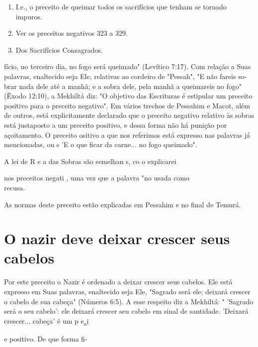 \begin{itemize}
\begin{enumrate}
\begin{itemize}
\begin{itemize}
\begin{enumerate}
\def\labelenumi{\arabic{enumi}.}
\setcounter{enumi}{118}
\item
 
 I.e., o preceito de queimar todos os sacrifícios que tenham se tornado
 impuros.
 
\item
 
 Ver os preceitos negativos 323 a 329.
 
\item
 
 Dos Sacrifícios Consagrados.
 
\end{enumerate}




fício, no terceiro dia, no fogo será queimado" (Levítico 7:17). Com
relação a Suas palavras, enaltecido seja Ele, relativas ao cordeiro de
"Pessah", "E não fareis so­brar nada dele até a manhã; e a sobra dele,
pela manhã a queimareis no fogo" (Êxodo 12:10), a Mekhiltá diz: "O
objetivo das Escrituras é estipular um preceito positivo para o preceito
negativo". Em vários trechos de Pessahim e Macot, além de outros, está
explicitamente declarado que o preceito negativo relativo às so­bras
está justaposto a um preceito positivo, e dessa forma não há punição por
açoitamento. O preceito ositivo a que nos referimos está expresso nas
palavras já mencionadas, ou s 'E o que ficar da carne... no fogo
queimado".

A lei de R e a das Sobras são semelhan s, co o explicarei

nos preceitos negati , uma vez que a palavra "no usada como\\
recusa.

As normas deste preceito estão explicadas em Pessahim e no final de
Temurá.

\section{O nazir deve deixar crescer seus cabelos}

Por este preceito o Nazir é ordenado a deixar crescer seus cabelos. Ele
está expresso em Suas palavras, enaltecido seja Ele, "Sagrado será ele;
dei­xará crescer o cabelo de sua cabeça" (Números 6:5). A esse respeito
diz a Mek­hiltá: " 'Sagrado será o seu cabelo': ele deixará crescer seu
cabelo em sinal de santidade. 'Deixará crescer... cabeça' é um p
e\textsubscript{a}i

e positivo. De que forma fi-


\end{itemize}
\end{itemize}
\end{enumrate}
\end{itemize}
